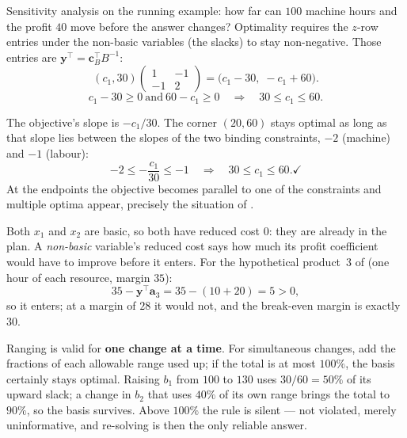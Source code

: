 \begin{worked}{Sensitivity analysis on the running example: how far can $100$ machine hours and the profit $40$ move before the answer changes?}
Optimality requires the $z$-row entries under the non-basic variables
(the slacks) to stay non-negative. Those entries are
$\mathbf y^{\!\top}=\mathbf c_{B}^{\!\top}B^{-1}$:
\[
  (c_{1},30)\begin{pmatrix}1&-1\\-1&2\end{pmatrix}
  =\bigl(c_{1}-30,\;-c_{1}+60\bigr).
\]
\[
  c_{1}-30\ge0\ \text{and}\ 60-c_{1}\ge0
  \quad\Longrightarrow\quad
  \boxed{30\le c_{1}\le60 .}
\]

The objective's slope is $-c_{1}/30$. The corner $(20,60)$ stays optimal as
long as that slope lies between the slopes of the two binding constraints,
$-2$ (machine) and $-1$ (labour):
\[
  -2\le-\frac{c_{1}}{30}\le-1
  \quad\Longrightarrow\quad
  30\le c_{1}\le60 . \checkmark
\]
At the endpoints the objective becomes parallel to one of the constraints
and multiple optima appear, precisely the situation of .

Both $x_{1}$ and $x_{2}$ are basic, so both have reduced cost $0$: they are
already in the plan. A \emph{non-basic} variable's reduced cost says how
much its profit coefficient would have to improve before it enters. For the
hypothetical product~3 of  (one hour of each resource, margin
$35$):
\[
  35-\mathbf y^{\!\top}\mathbf a_{3}=35-(10+20)=5>0 ,
\]
so it enters; at a margin of $28$ it would not, and the break-even margin is
exactly $30$.

Ranging is valid for \textbf{one change at a time}. For simultaneous
changes, add the fractions of each allowable range used up; if the total is
at most $100\%$, the basis certainly stays optimal. Raising $b_{1}$ from
$100$ to $130$ uses $30/60=50\%$ of its upward slack; a change in $b_{2}$
that uses $40\%$ of its own range brings the total to $90\%$, so the basis
survives. Above $100\%$ the rule is silent --- not violated, merely
uninformative, and re-solving is then the only reliable answer.


\end{worked}
